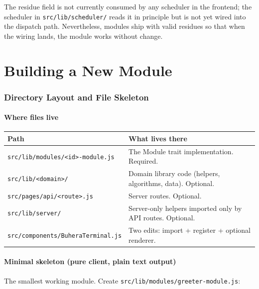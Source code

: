\documentclass[11pt,a4paper]{article}
\theoremstyle{contract}
\begin{document}
The residue field is not currently consumed by any scheduler in the
frontend; the scheduler in \texttt{src/lib/scheduler/} reads it in
principle but is not yet wired into the dispatch path. Nevertheless,
modules ship with valid residues so that when the wiring lands, the
module works without change.

\part{Building a New Module}

\section{Directory Layout and File Skeleton}
\label{sec:skeleton}

\subsection{Where files live}

\begin{tabularx}{\linewidth}{lX}
\toprule
\textbf{Path} & \textbf{What lives there} \\
\midrule
\texttt{src/lib/modules/<id>-module.js} & The Module trait implementation. Required. \\
\texttt{src/lib/<domain>/} & Domain library code (helpers, algorithms, data). Optional. \\
\texttt{src/pages/api/<route>.js} & Server routes. Optional. \\
\texttt{src/lib/server/} & Server-only helpers imported only by API routes. Optional. \\
\texttt{src/components/BuheraTerminal.js} & Two edits: import + register + optional renderer. \\
\bottomrule
\end{tabularx}

\subsection{Minimal skeleton (pure client, plain text output)}

The smallest working module. Create
\texttt{src/lib/modules/greeter-module.js}:
\end{document}
